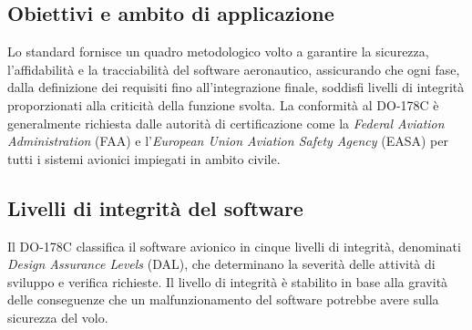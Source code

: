 \documentclass[italian, Lau, oneside]{sapthesis} %
\begin{document}
\subsection{Obiettivi e ambito di applicazione}
Lo standard fornisce un quadro metodologico volto a garantire la sicurezza, l’affidabilità e la tracciabilità del software aeronautico, assicurando che ogni fase, dalla definizione dei requisiti fino all’integrazione finale, soddisfi livelli di integrità proporzionati alla criticità della funzione svolta.  
La conformità al DO-178C è generalmente richiesta dalle autorità di certificazione come la \emph{Federal Aviation Administration} (FAA) e l’\emph{European Union Aviation Safety Agency} (EASA) per tutti i sistemi avionici impiegati in ambito civile.


\subsection{Livelli di integrità del software}

Il DO-178C classifica il software avionico in cinque livelli di integrità, denominati \emph{Design Assurance Levels} (DAL), che determinano la severità delle attività di sviluppo e verifica richieste.  
Il livello di integrità è stabilito in base alla gravità delle conseguenze che un malfunzionamento del software potrebbe avere sulla sicurezza del volo.
\end{document}
